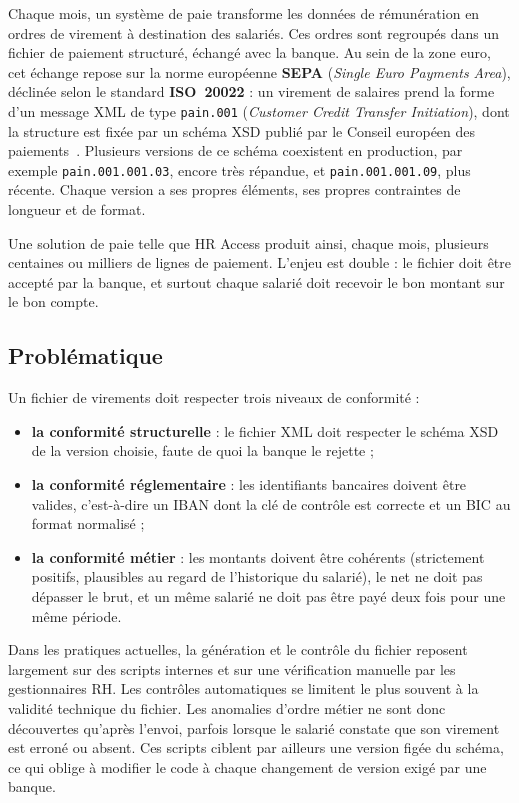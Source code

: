 Chaque mois, un système de paie transforme les données de rémunération en ordres de virement à destination des salariés. Ces ordres sont regroupés dans un fichier de paiement structuré, échangé avec la banque. Au sein de la zone euro, cet échange repose sur la norme européenne \textbf{SEPA} (\textit{Single Euro Payments Area}), déclinée selon le standard \textbf{ISO~20022} : un virement de salaires prend la forme d'un message XML de type \texttt{pain.001} (\textit{Customer Credit Transfer Initiation}), dont la structure est fixée par un schéma XSD publié par le Conseil européen des paiements~\cite{epc,iso20022}. Plusieurs versions de ce schéma coexistent en production, par exemple \texttt{pain.001.001.03}, encore très répandue, et \texttt{pain.001.001.09}, plus récente. Chaque version a ses propres éléments, ses propres contraintes de longueur et de format.

Une solution de paie telle que HR Access produit ainsi, chaque mois, plusieurs centaines ou milliers de lignes de paiement. L'enjeu est double : le fichier doit être accepté par la banque, et surtout chaque salarié doit recevoir le bon montant sur le bon compte.

\subsection{Problématique}

Un fichier de virements doit respecter trois niveaux de conformité :
\begin{itemize}
    \item \textbf{la conformité structurelle} : le fichier XML doit respecter le schéma XSD de la version choisie, faute de quoi la banque le rejette ;
    \item \textbf{la conformité réglementaire} : les identifiants bancaires doivent être valides, c'est-à-dire un IBAN dont la clé de contrôle est correcte et un BIC au format normalisé ;
    \item \textbf{la conformité métier} : les montants doivent être cohérents (strictement positifs, plausibles au regard de l'historique du salarié), le net ne doit pas dépasser le brut, et un même salarié ne doit pas être payé deux fois pour une même période.
\end{itemize}

Dans les pratiques actuelles, la génération et le contrôle du fichier reposent largement sur des scripts internes et sur une vérification manuelle par les gestionnaires RH. Les contrôles automatiques se limitent le plus souvent à la validité technique du fichier. Les anomalies d'ordre métier ne sont donc découvertes qu'après l'envoi, parfois lorsque le salarié constate que son virement est erroné ou absent. Ces scripts ciblent par ailleurs une version figée du schéma, ce qui oblige à modifier le code à chaque changement de version exigé par une banque.

